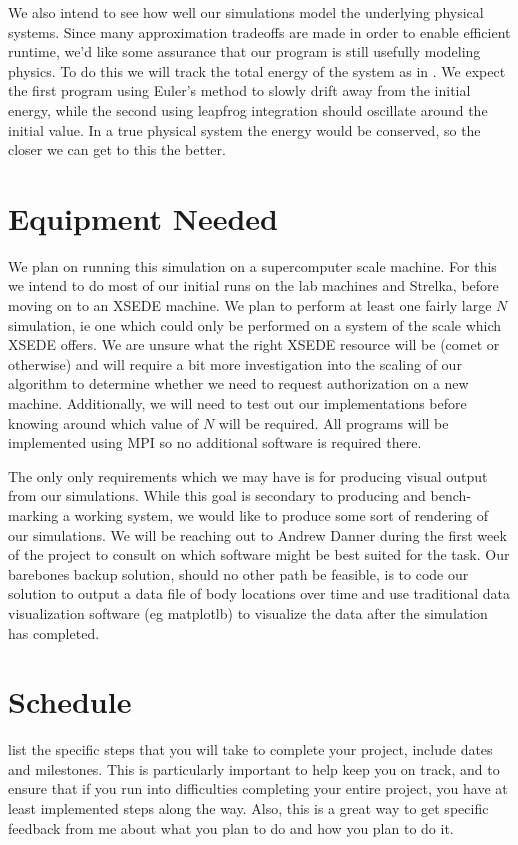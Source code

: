 \documentclass[11pt]{article}
\begin{document}
We also intend to see how well our simulations model the underlying physical systems. Since many approximation tradeoffs are made in order to enable efficient runtime, we'd like some assurance that our program is still usefully modeling physics. To do this we will track the total energy of the system as in \cite{Harvard_205}. We expect the first program using Euler's method to slowly drift away from the initial energy, while the second using leapfrog integration should oscillate around the initial value. In a true physical system the energy would be conserved, so the closer we can get to this the better.

\section {Equipment Needed}\label{equip}
We plan on running this simulation on a supercomputer scale machine. For this we intend to do most of our initial runs on the lab machines and Strelka, before moving on to an XSEDE machine. We plan to perform at least one fairly large $N$ simulation, ie one which could only be performed on a system of the scale which XSEDE offers. We are unsure what the right XSEDE resource will be (comet or otherwise) and will require a bit more investigation into the scaling of our algorithm to determine whether we need to request authorization on a new machine. Additionally, we will need to test out our implementations before knowing around which value of $N$ will be required. All programs will be implemented using MPI so no additional software is required there.

The only only requirements which we may have is for producing visual output from our simulations. While this goal is secondary to producing and bench-marking a working system, we would like to produce some sort of rendering of our simulations. We will be reaching out to Andrew Danner during the first week of the project to consult on which software might be best suited for the task. Our barebones backup solution, should no other path be feasible, is to code our solution to output a data file of body locations over time and use traditional data visualization software (eg matplotlb) to visualize the data after the simulation has completed.

\section {Schedule}\label{sched}
list the specific steps that you will take to complete your project, include
dates and milestones. This is particularly important to help keep you on track,
and to ensure that if you run into difficulties completing your entire project,
you have at least implemented steps along the way. Also, this is a great way to
get specific feedback from me about what you plan to do and how you plan to do
it.  
\end{document}
